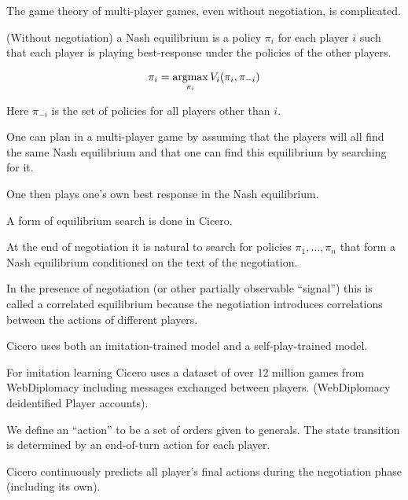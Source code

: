 {

The game theory of multi-player games, even without negotiation, is complicated.

\vfill
(Without negotiation) a Nash equilibrium is a policy $\pi_i$ for each player $i$ such that each player is playing best-response under
the policies of the other players.

$$\pi_i = \operatorname*{argmax}_{\pi_i} V_i(\pi_i,\pi_{-i})$$

\vfill
Here $\pi_{-i}$ is the set of policies for all players other than $i$.


One can plan in a multi-player game by assuming that the players will all find the same Nash equilibrium and that one can find
this equilibrium by searching for it.

\vfill
One then plays one's own best response in the Nash equilibrium.

\vfill
A form of equilibrium search is done in Cicero.


At the end of negotiation it is natural to search for policies $\pi_1,\ldots,\pi_n$ that form a Nash equilibrium
conditioned on the text of the negotiation.

\vfill
In the presence of negotiation (or other partially observable ``signal'') this is called a correlated equilibrium
because the negotiation introduces correlations between the actions of different players.



Cicero uses both an imitation-trained model and a self-play-trained model.

\vfill
For imitation learning Cicero uses 
a dataset of over 12 million games from WebDiplomacy including messages exchanged between players. (WebDiplomacy deidentified Player accounts).


\newcommand{\act}{\mathrm{act}}
\newcommand{\mess}{\mathrm{mess}}
\newcommand{\im}{\mathrm{im}}


We define an ``action'' to be a set of orders given to generals.  The state transition is determined by an end-of-turn action for each player.

\vfill
Cicero continuously predicts all player's final actions during the negotiation phase (including its own).

}
